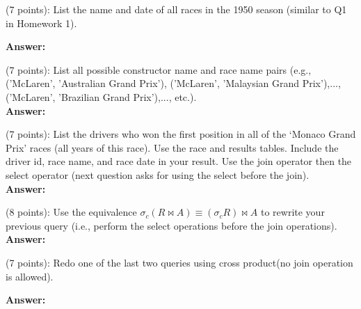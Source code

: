 \documentclass[12pt]{exam}
\begin{document}
\newpage


\begin{questions}

\question (7 points): List the name and date of all races in the 1950 season (similar to Q1 in Homework 1). 

\textbf{Answer:} \\

\newpage

   
\vspace{50 mm} 


\question (7 points): List all possible constructor name and race name pairs (e.g., ('McLaren', 'Australian Grand Prix'), ('McLaren', 'Malaysian Grand Prix'),..., ('McLaren', 'Brazilian Grand Prix'),..., etc.). \\

\textbf{Answer:} \\

\newpage



\question (7 points): List the drivers who won the first position in all of the `Monaco Grand Prix' races (all years of this race). Use the race and results tables. Include the driver id, race name, and race date in your result. Use the join operator then the select operator (next question asks for using the select before the join).\\

\textbf{Answer:} \\

\newpage


\question (8 points): Use the equivalence $\sigma_{c} (R\bowtie A) \equiv  (\sigma_{c}R)\bowtie A  $ to rewrite your previous query (i.e., perform the select operations before the join operations). \\

\textbf{Answer:} 

\newpage


\question (7 points):  Redo one of the last two queries using cross product(no join operation is allowed). 

\textbf{Answer:}  \\


\end{questions}
\end{document}

